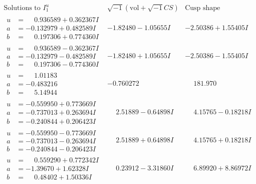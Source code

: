 \documentclass[1p]{elsarticle_modified}
\theoremstyle{definition}
\newcommand{\I}{\sqrt{-1}}
\begin{document}
$$\begin{array}{c|c|c}  
\text{Solutions to }I^u_{1}& \I (\text{vol} + \sqrt{-1}CS) & \text{Cusp shape}\\
 \hline 
\begin{aligned}
u &= \phantom{-}0.936589 + 0.362367 I \\
a &= -0.132979 + 0.482589 I \\
b &= \phantom{-}0.197306 + 0.774360 I\end{aligned}
 & -1.82480 - 1.05655 I & -2.50386 + 1.55405 I \\ \hline\begin{aligned}
u &= \phantom{-}0.936589 - 0.362367 I \\
a &= -0.132979 - 0.482589 I \\
b &= \phantom{-}0.197306 - 0.774360 I\end{aligned}
 & -1.82480 + 1.05655 I & -2.50386 - 1.55405 I \\ \hline\begin{aligned}
u &= \phantom{-}1.01183\phantom{ +0.000000I} \\
a &= -0.483216\phantom{ +0.000000I} \\
b &= \phantom{-}5.14944\phantom{ +0.000000I}\end{aligned}
 & -0.760272\phantom{ +0.000000I} & \phantom{-}181.970\phantom{ +0.000000I} \\ \hline\begin{aligned}
u &= -0.559950 + 0.773669 I \\
a &= -0.737013 + 0.263694 I \\
b &= -0.240844 + 0.206423 I\end{aligned}
 & \phantom{-}2.51889 - 0.64898 I & \phantom{-}4.15765 - 0.18218 I \\ \hline\begin{aligned}
u &= -0.559950 - 0.773669 I \\
a &= -0.737013 - 0.263694 I \\
b &= -0.240844 - 0.206423 I\end{aligned}
 & \phantom{-}2.51889 + 0.64898 I & \phantom{-}4.15765 + 0.18218 I \\ \hline\begin{aligned}
u &= \phantom{-}0.559290 + 0.772342 I \\
a &= -1.39670 + 1.62328 I \\
b &= \phantom{-}0.48402 + 1.50336 I\end{aligned}
 & \phantom{-}0.23912 - 3.31860 I & \phantom{-}6.89920 + 8.86972 I \\ \hline\begin{aligned}

\end{aligned}
\end{array}$$
\end{document}

